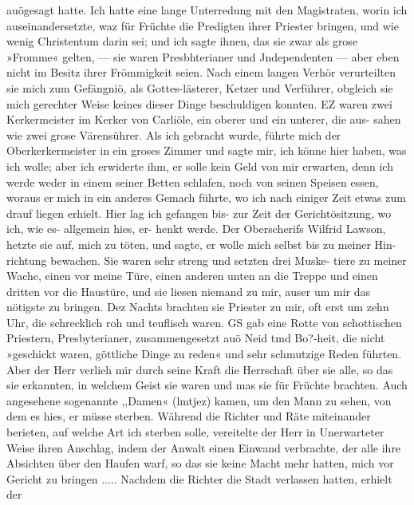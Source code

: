 auögesagt hatte. Ich hatte eine lange Unterredung mit den
Magistraten, worin ich auseinandersetzte, waz für Früchte die
Predigten ihrer Priester bringen, und wie wenig Christentum darin
sei; und ich sagte ihnen, das sie zwar als grose »Fromme«
gelten, — sie waren Presbhterianer und Jndependenten — aber
eben nicht im Besitz ihrer Frömmigkeit seien. Nach einem langen
Verhör verurteilten sie mich zum Gefängniö, als Gottes-lästerer,
Ketzer und Verführer, obgleich sie mich gerechter Weise keines
dieser Dinge beschuldigen konnten. EZ waren zwei Kerkermeister
im Kerker von Carliöle, ein oberer und ein unterer, die aus-
sahen wie zwei grose Värensührer. Als ich gebracht wurde,
führte mich der Oberkerkermeister in ein groses Zimmer und sagte
mir, ich könne hier haben, was ich wolle; aber ich erwiderte
ihm, er solle kein Geld von mir erwarten, denn ich werde weder
in einem seiner Betten schlafen, noch von seinen Speisen essen,
woraus er mich in ein anderes Gemach führte, wo ich nach einiger
Zeit etwas zum drauf liegen erhielt. Hier lag ich gefangen bis-
zur Zeit der Gerichtösitzung, wo ich, wie es- allgemein hies, er-
henkt werde. Der Oberscherifs Wilfrid Lawson, hetzte sie auf,
mich zu töten, und sagte, er wolle mich selbst bis zu meiner Hin-
richtung bewachen. Sie waren sehr streng und setzten drei Muske-
tiere zu meiner Wache, einen vor meine Türe, einen anderen
unten an die Treppe und einen dritten vor die Haustüre, und
sie liesen niemand zu mir, auser um mir das nötigste zu bringen.
Dez Nachts brachten sie Priester zu mir, oft erst um zehn Uhr,
die schrecklich roh und teuflisch waren. GS gab eine Rotte von
schottischen Priestern, Presbyterianer, zusammengesetzt auö Neid
tmd Bo?-heit, die nicht »geschickt waren, göttliche Dinge zu reden«
und sehr schmutzige Reden führten. Aber der Herr verlieh mir
durch seine Kraft die Herrschaft über sie alle, so das sie erkannten,
in welchem Geist sie waren und mas sie für Früchte brachten.
Auch angesehene sogenannte ,,Damen« (lmtjez) kamen, um den
Mann zu sehen, von dem es hies, er müsse sterben. Während
die Richter und Räte miteinander berieten, auf welche Art ich
sterben solle, vereitelte der Herr in Unerwarteter Weise ihren
Anschlag, indem der Anwalt einen Einwand verbrachte, der
alle ihre Absichten über den Haufen warf, so das sie keine
Macht mehr hatten, mich vor Gericht zu bringen .....
Nachdem die Richter die Stadt verlassen hatten, erhielt der


